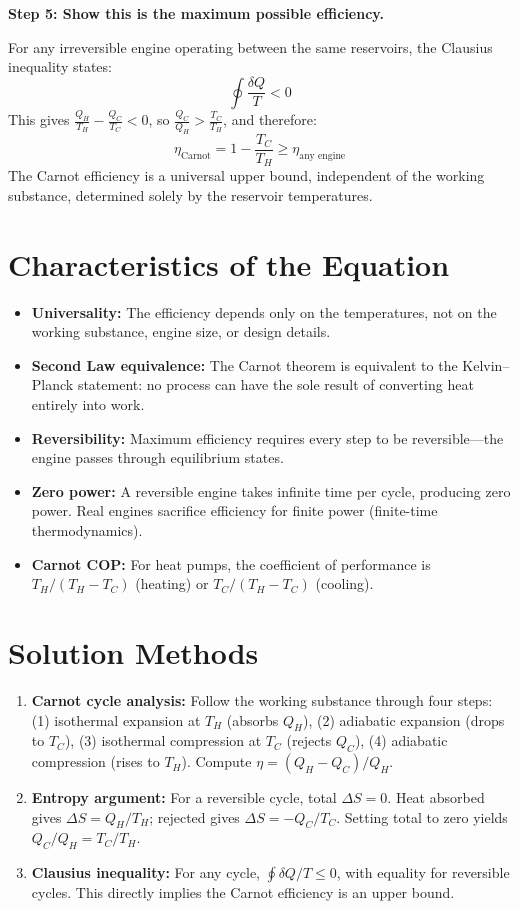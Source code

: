 \textbf{Step 5: Show this is the maximum possible efficiency.}

For any irreversible engine operating between the same reservoirs, the Clausius inequality states:
\begin{equation}
\oint \frac{\delta Q}{T} < 0
\end{equation}
This gives $\frac{Q_H}{T_H} - \frac{Q_C}{T_C} < 0$, so $\frac{Q_C}{Q_H} > \frac{T_C}{T_H}$, and therefore:
\begin{equation}
\boxed{\eta_{\text{Carnot}} = 1 - \frac{T_C}{T_H} \geq \eta_{\text{any engine}}}
\end{equation}
The Carnot efficiency is a universal upper bound, independent of the working substance, determined solely by the reservoir temperatures.

\section*{Characteristics of the Equation}

\begin{itemize}
\item \textbf{Universality:} The efficiency depends only on the temperatures, not on the working substance, engine size, or design details.
\item \textbf{Second Law equivalence:} The Carnot theorem is equivalent to the Kelvin--Planck statement: no process can have the sole result of converting heat entirely into work.
\item \textbf{Reversibility:} Maximum efficiency requires every step to be reversible---the engine passes through equilibrium states.
\item \textbf{Zero power:} A reversible engine takes infinite time per cycle, producing zero power. Real engines sacrifice efficiency for finite power (finite-time thermodynamics).
\item \textbf{Carnot COP:} For heat pumps, the coefficient of performance is $T_H/(T_H - T_C)$ (heating) or $T_C/(T_H - T_C)$ (cooling).
\end{itemize}
\section*{Solution Methods}

\begin{enumerate}
\item \textbf{Carnot cycle analysis:} Follow the working substance through four steps: (1) isothermal expansion at $T_H$ (absorbs $Q_H$), (2) adiabatic expansion (drops to $T_C$), (3) isothermal compression at $T_C$ (rejects $Q_C$), (4) adiabatic compression (rises to $T_H$). Compute $\eta = (Q_H - Q_C)/Q_H$.
\item \textbf{Entropy argument:} For a reversible cycle, total $\Delta S = 0$. Heat absorbed gives $\Delta S = Q_H/T_H$; rejected gives $\Delta S = -Q_C/T_C$. Setting total to zero yields $Q_C/Q_H = T_C/T_H$.
\item \textbf{Clausius inequality:} For any cycle, $\oint \delta Q/T \leq 0$, with equality for reversible cycles. This directly implies the Carnot efficiency is an upper bound.
\end{enumerate}
